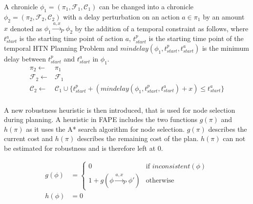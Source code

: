 \begin{definition}
    A chronicle $\phi_1 = (\pi_1,\mathcal{F}_1,\mathcal{C}_1)$ can be changed into a chronicle $\phi_2 = (\pi_2,\mathcal{F}_2,\mathcal{C}_2)$ with a delay perturbation on an action $a \in \pi_1$ by an amount $x$ denoted as $\phi_1 \xrightarrow{a,x}_P \phi_2$ by the addition of a temporal constraint as follows, where $t^a_{start}$ is the starting time point of action $a$, $t^p_{start}$ is the starting time point of the temporal HTN Planning Problem and $mindelay(\phi_1,t^p_{start},t^a_{start})$ is the minimum delay between $t^p_{start}$ and $t^a_{start}$ in $\phi_1$.
    \begin{align*}
        \pi_2 \leftarrow & \pi_1 \\
        \mathcal{F}_2 \leftarrow & \mathcal{F}_1 \\
        \mathcal{C}_2 \leftarrow & \mathcal{C}_1 \cup \{t^p_{start} + (mindelay(\phi_1,t^p_{start},t^a_{start}) + x) \leq t^a_{start}\} \\
    \end{align*}
\end{definition}



A new robustness heuristic is then introduced, that is used for node selection during planning.
A heuristic in FAPE includes the two functions $g(\pi)$ and $h(\pi)$ as it uses the A* search algorithm for node selection.
$g(\pi)$ describes the current cost and $h(\pi)$ describes the remaining cost of the plan.
$h(\pi)$ can not be estimated for robustness and is therefore left at 0.

\begin{align}
    g(\phi) &= \begin{cases}
        0 &\text{if } inconsistent(\phi) \\
        1 + g(\phi \xrightarrow{a,x}_P \phi') &\text{otherwise}
    \end{cases} \\
    h(\phi) &= 0
\end{align}

